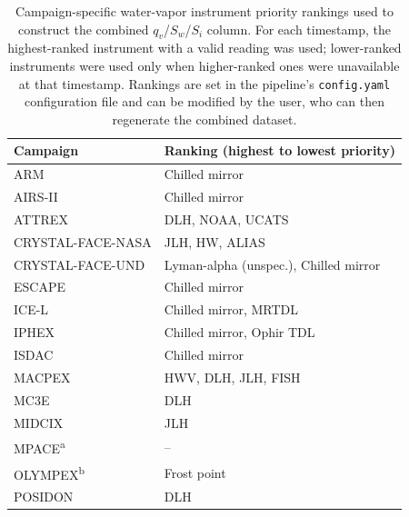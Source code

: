 %
%
% 

\begin{table}[htbp]
  \centering
  \caption{Campaign-specific water-vapor instrument priority rankings
    used to construct the combined $q_v$/$S_w$/$S_i$ column. For each
    timestamp, the highest-ranked instrument with a valid reading was
    used; lower-ranked instruments were used only when higher-ranked
    ones were unavailable at that timestamp. Rankings are set in the
    pipeline's \texttt{config.yaml} configuration file and can be
    modified by the user, who can then regenerate the combined dataset.}
  \label{tab:h2o-ranking}
  \begin{tabular}{ll}
    \toprule
    Campaign & Ranking (highest to lowest priority) \\
    \midrule
    ARM                         & Chilled mirror \\
    AIRS-II                     & Chilled mirror \\
    ATTREX                      & DLH, NOAA, UCATS \\
    CRYSTAL-FACE-NASA           & JLH, HW, ALIAS \\
    CRYSTAL-FACE-UND            & Lyman-alpha (unspec.), Chilled mirror \\
    ESCAPE                      & Chilled mirror \\
    ICE-L                       & Chilled mirror, MRTDL \\
    IPHEX                       & Chilled mirror, Ophir TDL \\
    ISDAC                       & Chilled mirror \\
    MACPEX                      & HWV, DLH, JLH, FISH \\
    MC3E                        & DLH \\
    MIDCIX                      & JLH \\
    MPACE\textsuperscript{a}    & -- \\
    OLYMPEX\textsuperscript{b}  & Frost point \\
    POSIDON                     & DLH \\
    \bottomrule
  \end{tabular}


\end{table}
